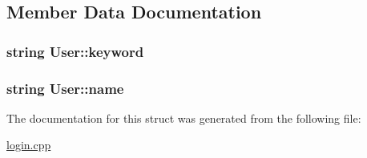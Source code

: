 \subsection{\-Member \-Data \-Documentation}
\hypertarget{struct_user_a7383a88f44f38d4c0fd63a9ea63c0cab}{
\subsubsection[{keyword}]{\setlength{\rightskip}{0pt plus 5cm}string {\bf \-User\-::keyword}}}\label{struct_user_a7383a88f44f38d4c0fd63a9ea63c0cab}
\hypertarget{struct_user_a643f85779a4693855c171c396f49e515}{
\subsubsection[{name}]{\setlength{\rightskip}{0pt plus 5cm}string {\bf \-User\-::name}}}\label{struct_user_a643f85779a4693855c171c396f49e515}


\-The documentation for this struct was generated from the following file\-:\begin{DoxyCompactItemize}
\item 
\hyperlink{login_8cpp}{login.\-cpp}\end{DoxyCompactItemize}

